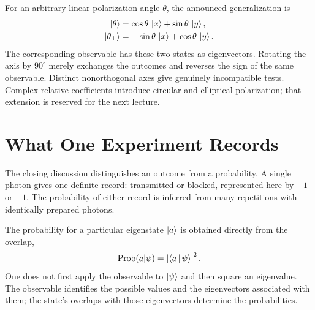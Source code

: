 For an arbitrary linear-polarization angle \(\theta\), the announced
generalization is
\begin{align}
  \left\lvert\theta\right\rangle
  &=\cos\theta\,\left\lvert x\right\rangle+\sin\theta\,\left\lvert y\right\rangle,\\
  \left\lvert\theta_\perp\right\rangle
  &=-\sin\theta\,\left\lvert x\right\rangle+\cos\theta\,\left\lvert y\right\rangle.
  \label{eq:general-linear-polarization}
\end{align}
The corresponding observable has these two states as eigenvectors. Rotating
the axis by \(90^\circ\) merely exchanges the outcomes and reverses the sign
of the same observable. Distinct nonorthogonal axes give genuinely
incompatible tests. Complex relative coefficients introduce circular and
elliptical polarization; that extension is reserved for the next lecture.

\section{What One Experiment Records}

The closing discussion distinguishes an outcome from a probability. A
single photon gives one definite record: transmitted or blocked, represented
here by \(+1\) or \(-1\). The probability of either record is inferred from
many repetitions with identically prepared photons.

\begin{classroomqa}
\end{classroomqa}

The probability for a particular eigenstate \(\left\lvert a\right\rangle\) is obtained directly
from the overlap,
\begin{equation}
  \operatorname{Prob}(a|\psi)=\left|\left\langle a\,\middle|\,\psi\right\rangle\right|^2.
  \label{eq:born-overlap}
\end{equation}
One does not first apply the observable to \(\left\lvert\psi\right\rangle\) and then square an
eigenvalue. The observable identifies the possible values and the
eigenvectors associated with them; the state's overlaps with those
eigenvectors determine the probabilities.

\begin{classroomqa}
\end{classroomqa}

